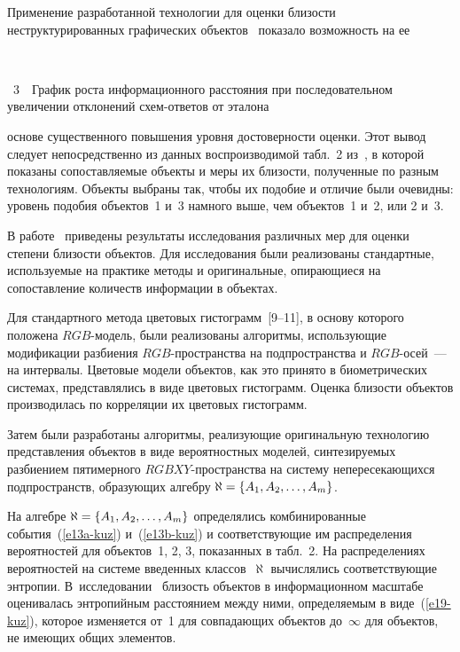 \begin{multicols}{2}
  Применение разработанной технологии для оценки близости
неструктурированных графических объектов~\cite{5-kuz} показало
возможность на ее\linebreak\vspace*{-12pt}

\pagebreak

\noindent
\begin{center}  %
 \mbox{%
 \epsfxsize=76.837mm
 }
  \end{center}
{{\figurename~3}\ \ \small{График роста информационного расстояния при последовательном увеличении
отклонений схем-от\-ве\-тов от эталона}}

\vspace*{12pt}

\addtocounter{figure}{1}


\noindent
 основе существенного повышения уровня до\-сто\-вер\-ности
оценки. Этот вывод следует непосредственно из данных воспроизводимой
табл.~2 из~\cite{5-kuz}, в которой показаны сопоставляемые объекты и меры их
близости, полученные по разным технологиям. Объекты выбраны так, чтобы их
подобие и отличие были очевидны: уровень подобия объектов~1 и~3 намного
выше, чем объектов~1 и~2, или 2 и~3.

  В работе~\cite{5-kuz} приведены результаты исследования различных мер
для оценки степени близости объектов. Для исследования были реализованы
стандартные, используемые на практике методы и оригинальные, опирающиеся
на сопоставление количеств информации в объектах.




  Для стандартного метода цветовых гистограмм~[9--11], в
основу которого положена $RGB$-мо\-дель, были реализованы алгоритмы,
ис\-поль\-зу\-ющие модификации разбиения $RGB$-про\-стран\-ст\-ва на
подпространства и $RGB$-осей~--- на интервалы. Цветовые модели объектов,
как это принято в биометрических системах, представлялись в виде цветовых
гистограмм. Оценка близости объектов производилась по корреляции их
цветовых гистограмм.

  Затем были разработаны алгоритмы, реализу\-ющие оригинальную
технологию представления объектов в виде вероятностных моделей,
син\-те\-зи\-ру\-емых разбиением пятимерного $RGBXY$-про\-стран\-ст\-ва на
сис\-те\-му непересека\-ющих\-ся подпространств, образующих алгебру
$\aleph\hm=\{A_1, A_2, \ldots , A_m\}$.

  На алгебре $\aleph\hm=\{A_1, A_2, \ldots , A_m\}$ определялись
комбинированные события~(\ref{e13a-kuz}) и~(\ref{e13b-kuz}) и
соответствующие им распределения вероятностей для объектов~1, 2, 3,
показанных в табл.~2. На распределениях вероятностей на системе введенных
классов~$\aleph$ вычислялись соответствующие энтропии.
В~исследовании~\cite{5-kuz} близость объектов в информационном масштабе
оценивалась энтропийным расстоянием между ними, определяемым в
виде~(\ref{e19-kuz}), которое изменяется от~1 для совпадающих объектов
до~$\infty$ для объектов, не имеющих общих элементов.


\end{multicols}
